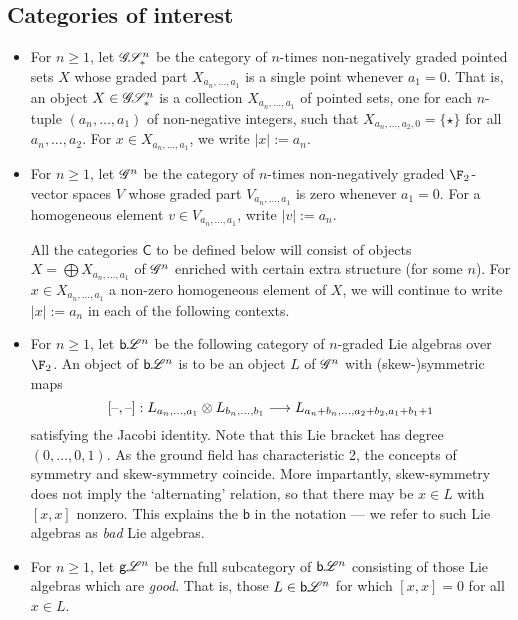 \documentclass[11pt]{article}
\newcommand{\GoodLie}[1]{\mathsf{g}{\scrL}^{#1}}%
\newcommand{\BadLie}[1]{\mathsf{b}{\scrL}^{#1}}%
\newcommand{\GR}[1]{\scrG^{#1}}%
\newcommand{\GpS}[1]{\scrG\!\scrS^{#1}_*}
\newcommand{\forget}{\mathrm{fg}}
\begin{document}
\subsection*{Categories of interest}
\begin{itemize}
\setlength{\parindent}{.25in}
\item For $n\geq1$, let $\GpS{n}$ be the category of $n$-times non-negatively graded pointed sets $X$ whose graded part $X_{a_n,\ldots,a_1}$ is a single point whenever $a_1=0$. That is, an object $X\in\GpS{n}$ is a collection $X_{a_n,\ldots,a_1}$ of pointed sets, one for each $n$-tuple $(a_n,\ldots,a_1)$ of non-negative integers, such that $X_{a_n,\ldots,a_2,0}=\{\star\}$ for all $a_n,\ldots,a_2$. For $x\in X_{a_n,\ldots,a_1}$, we write $|x|:=a_n$.




\item For $n\geq1$, let $\GR{n}$ be the category of $n$-times non-negatively graded $\F_2$-vector spaces $V$ whose graded part $V_{a_n,\ldots,a_1}$ is zero whenever $a_1=0$.  For a homogeneous element $v\in V_{a_n,\ldots,a_1}$, write $|v|:=a_n$.

All the categories $\mathsf{C}$ to be defined below will consist of objects $X=\bigoplus X_{a_n,\ldots,a_1}$ of $\GR{n}$ enriched with certain extra structure (for some $n$). For $x\in X_{a_n,\ldots,a_1}$ a non-zero homogeneous element of $X$, we will continue to write $|x|:=a_n$ in each of the following contexts.

\item For $n\geq1$, let $\BadLie{n}$ be the following category of $n$-graded Lie algebras over $\F_2$. An object of $\BadLie{n}$ is to be an object $L$ of $\GR{n}$ with (skew-)symmetric maps
\[[\textup{--},\textup{--}]:L_{a_n,\ldots,a_1}\otimes L_{b_n,\ldots,b_1}\longrightarrow L_{a_n+b_n,\ldots,a_2+b_2,a_1+b_1+1}\]
satisfying the Jacobi identity. Note that this Lie bracket has degree $(0,\ldots,0,1)$. As the ground field has characteristic 2, the concepts of symmetry and skew-symmetry coincide. More impartantly, skew-symmetry does not imply the `alternating' relation, so that there may be $x\in L$ with $[x,x]$ nonzero. This explains the $\mathsf{b}$ in the notation --- we refer to such Lie algebras as \emph{bad} Lie algebras.
\item For $n\geq1$, let $\GoodLie{n}$ be the full subcategory of $\BadLie{n}$ consisting of those Lie algebras which are \emph{good}. That is, those $L\in\BadLie{n}$ for which $[x,x]=0$ for all $x\in L$.


\end{itemize}
\end{document}
